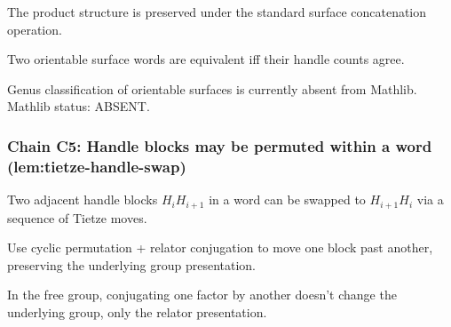 \begin{lemma}
\label{lem:toh-r3}
The product structure is preserved under the standard surface concatenation operation.
\leanok
\end{lemma}

\begin{lemma}
\label{lem:toh-r4}
Two orientable surface words are equivalent iff their handle counts agree.
\leanok
\end{lemma}

\begin{lemma}
\label{lem:toh-r5}
Genus classification of orientable surfaces is currently absent from Mathlib.  Mathlib status: ABSENT.
\leanok
\end{lemma}

\subsubsection*{Chain C5: Handle blocks may be permuted within a word (lem:tietze-handle-swap)}

\begin{lemma}
\label{lem:ths-r1}
Two adjacent handle blocks $H_{i}H_{i+1}$ in a word can be swapped to $H_{i+1}H_{i}$ via a sequence of Tietze moves.
\leanok
\end{lemma}

\begin{lemma}
\label{lem:ths-r2}
Use cyclic permutation + relator conjugation to move one block past another, preserving the underlying group presentation.
\leanok
\end{lemma}

\begin{lemma}
\label{lem:ths-r3}
In the free group, conjugating one factor by another doesn't change the underlying group, only the relator presentation.
\leanok
\end{lemma}

